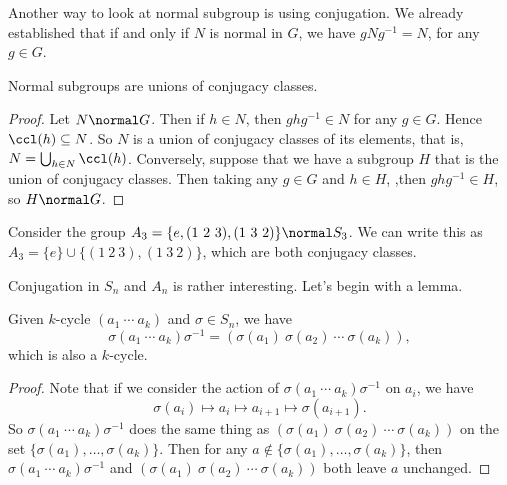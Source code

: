 \documentclass[a4]{scrreprt}
\begin{document}
Another way to look at normal subgroup is using conjugation. We already established that if and only if $N$ is normal in $G$, we have $g N g^{-1} = N$, for any $g \in G$.

\begin{proposition}
	Normal subgroups are unions of conjugacy classes.
\end{proposition}
\begin{proof}
	Let $N \normal G$. Then if $h \in N$, then $ghg^{-1} \in N$ for any $g \in G$. Hence $\ccl(h) \subseteq N$.
	So $N$ is a union of conjugacy classes of its elements, that is, $N = \bigcup_{h \in N} \ccl(h)$.
	Conversely, suppose that we have a subgroup $H$ that is the union of conjugacy classes. Then taking any $g \in G$ and $h \in H$, ,then $ghg^{-1} \in H$, so $H \normal G$.
\end{proof}

\begin{example}
	Consider the group $A_3 = \{e, (1\ 2\ 3), (1\ 3\ 2)\} \normal S_3$. We can write this as $A_3 = \{e\} \cup \{(1\ 2\ 3), (1\ 3\ 2)\}$, which are both conjugacy classes.
\end{example}

Conjugation in $S_n$ and $A_n$ is rather interesting. Let's begin with a lemma.

\begin{lemma}
	Given $k$-cycle $(a_1\ \cdots\ a_k)$ and $\sigma \in S_n$, we have
	$$
	\sigma (a_1 \ \cdots\ a_k) \sigma^{-1} = (\sigma(a_1)\ \sigma(a_2)\ \cdots \ \sigma(a_k)),
	$$
	which is also a $k$-cycle.
\end{lemma}
\begin{proof}
	Note that if we consider the action of $\sigma (a_1 \ \cdots\ a_k) \sigma^{-1}$ on $a_i$, we have
	$$
	\sigma(a_i) \mapsto a_{i} \mapsto a_{i + 1} \mapsto \sigma(a_{i + 1}).
	$$
	So $\sigma (a_1 \ \cdots\ a_k) \sigma^{-1}$ does the same thing as $(\sigma(a_1)\ \sigma(a_2)\ \cdots \ \sigma(a_k))$ on the set $\{\sigma(a_1), \dots, \sigma(a_k)\}$.  Then for any $a \not \in \{\sigma(a_1), \dots, \sigma(a_k)\}$, then $\sigma (a_1 \ \cdots\ a_k) \sigma^{-1}$ and  $(\sigma(a_1)\ \sigma(a_2)\ \cdots \ \sigma(a_k))$ both leave $a$ unchanged.
\end{proof}
\end{document}
